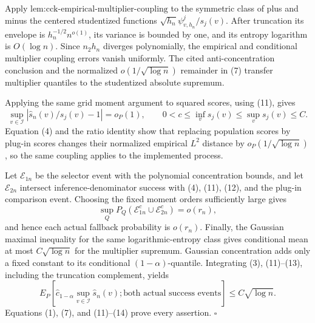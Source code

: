 Apply \(\text{lem:cck-empirical-multiplier-coupling}\) to the symmetric class of plus and minus the centered studentized functions
\(\sqrt{h_n}\psi^j_{v,h_n}/s_j(v)\).  After truncation its envelope is
\(h_n^{-1/2}n^{o(1)}\), its variance is bounded by one, and its entropy logarithm is \(O(\log n)\).  Since \(n_2h_n\) diverges polynomially, the empirical and conditional multiplier coupling errors vanish uniformly.  The cited anti-concentration conclusion and the normalized \(o(1/\sqrt{\log n})\) remainder in (7) transfer multiplier quantiles to the studentized absolute supremum.

Applying the same grid moment argument to squared scores, using (11), gives
\[
 \sup_{v\in\mathcal I}\left|\widehat s_n(v)/s_j(v)-1\right|=o_P(1),
 \qquad 0<c\le\inf_v s_j(v)\le\sup_v s_j(v)\le C. \tag{12}
\]
Equation (4) and the ratio identity show that replacing population scores by plug-in scores changes their normalized empirical \(L^2\) distance by
\(o_P(1/\sqrt{\log n})\), so the same coupling applies to the implemented process.

Let \(\mathcal E_{1n}\) be the selector event with the polynomial concentration bounds, and let \(\mathcal E_{2n}\) intersect inference-denominator success with (4), (11), (12), and the plug-in comparison event.  Choosing the fixed moment orders sufficiently large gives
\[
 \sup_QP_Q(\mathcal E_{1n}^c\cup\mathcal E_{2n}^c)=o(r_n), \tag{13}
\]
and hence each actual fallback probability is \(o(r_n)\).
Finally, the Gaussian maximal inequality for the same logarithmic-entropy class gives conditional mean at most \(C\sqrt{\log n}\) for the multiplier supremum.  Gaussian concentration adds only a fixed constant to its conditional \((1-\alpha)\)-quantile.  Integrating (3), (11)--(13), including the truncation complement, yields
\[
 E_P\left[\widehat c_{1-\alpha}\sup_{v\in\mathcal I}\widehat s_n(v);
 \text{both actual success events}\right]\le C\sqrt{\log n}. \tag{14}
\]
Equations (1), (7), and (11)--(14) prove every assertion. \(\square\)